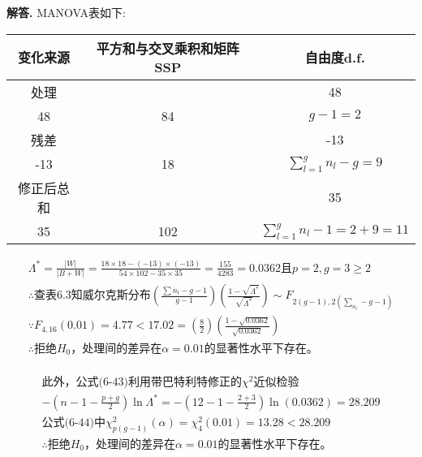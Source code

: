 \documentclass[12pt, a4paper, oneside]{ctexart}
\newenvironment{solution}{\par\noindent\textbf{解答. }}{\par}
\begin{document}
\begin{solution}
MANOVA表如下:

\begin{table}[htb]
    \centering
    \begin{tabular}{ccc}
    \toprule
    \rowcolor[HTML]{C0C0C0}
    变化来源  & 平方和与交叉乘积和矩阵SSP & 自由度d.f.   \\
    \midrule
    处理    & \(B=\begin{bmatrix} 36 & 48 \\ 48 & 84 \end{bmatrix} \)   & \(g-1=2\)    \\
    残差    & \(W=\begin{bmatrix} 18 & -13 \\ -13 & 18 \end{bmatrix} \)             & \(\sum_{l=1}^{g}n_l-g=9\)\\
    \midrule
    修正后总和 & \(B+W=\begin{bmatrix} 54 & 35 \\ 35 & 102 \end{bmatrix} \) & \(\sum_{l=1}^{g} n_l -1=2+9=11\)   \\
    \bottomrule
    \end{tabular}
\end{table}

\[
    \begin{gathered}
        \Lambda^\ast=\frac{|W|}{|B+W|}=\frac{18\times 18-(-13)\times(-13)}{54 \times 102 - 35 \times 35}=\frac{155}{4283}=0.0362
        \text{且} p=2,g=3\geqslant 2\\
        \therefore \text{查表6.3知威尔克斯分布} \left( \frac{ \sum n_{l} - g - 1 } {g - 1} \right) \left( \frac{ 1 - \sqrt{\Lambda^{*} } } { \sqrt{\Lambda^{*} } } \right)  \sim F_{2 ( g-1 ),  2 (  \sum_{n_l}-g-1 )}\\
        \because F_{4,16}(0.01)=4.77 < 17.02=\left(\frac{8}{2}\right)\left(\frac{1-\sqrt{0.0362}}{\sqrt{0.0362}}\right)\\
        \therefore \text{拒绝}H_0\text{，处理间的差异在}\alpha=0.01\text{的显著性水平下存在。}\\
    \end{gathered}
\]

\[
    \begin{gathered}
        \text{此外，公式(6-43)利用带巴特利特修正的}\chi^2\text{近似检验}\\
        - \left( n-1-\frac{ p+g }{2} \right) \ln \Lambda^\ast=
        - \left( 12-1-\frac{ 2+3 }{2} \right) \ln(0.0362)=28.209\\
        \text{公式(6-44)中}\chi^2_{p(g-1)}(\alpha)=\chi^2_{4}(0.01)=13.28<28.209\\
        \therefore \text{拒绝}H_0\text{，处理间的差异在}\alpha=0.01\text{的显著性水平下存在。}
    \end{gathered}
\]
\end{solution}
\end{document}
